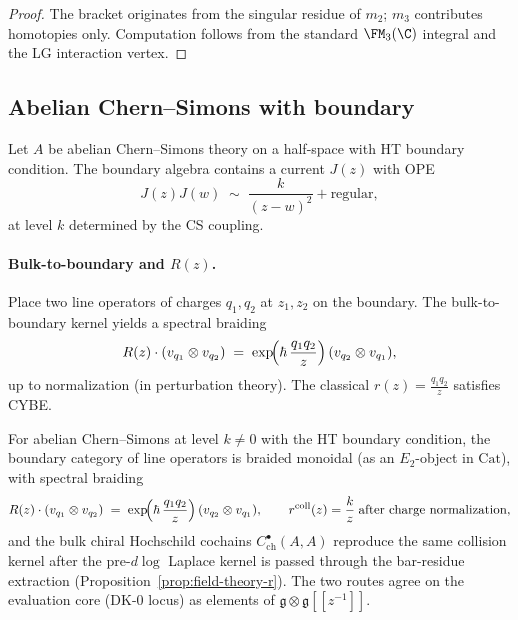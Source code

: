 \begin{proof}
The bracket originates from the singular residue of $m_2$; $m_3$ contributes homotopies only. Computation follows from the standard $\FM_3(\C)$ integral and the LG interaction vertex.
\end{proof}

\subsection{Abelian Chern--Simons with boundary}
\label{subsec:CS-abelian}
Let $A$ be abelian Chern--Simons theory on a half-space with HT boundary condition. The boundary algebra contains a current $J(z)$ with OPE
\[
J(z)J(w) \;\sim\; \frac{k}{(z-w)^2} + \text{regular},
\]
at level $k$ determined by the CS coupling.

\paragraph{Bulk-to-boundary and $R(z)$.}
Place two line operators of charges $q_1,q_2$ at $z_1,z_2$ on the boundary. The bulk-to-boundary kernel yields a spectral braiding
\[
R(z)\cdot (v_{q_1}\otimes v_{q_2}) \;=\; \exp\!\Bigl( \hbar\, \frac{q_1 q_2}{z} \Bigr) \,(v_{q_2}\otimes v_{q_1}),
\]
up to normalization (in perturbation theory). The classical $r(z)=\frac{q_1 q_2}{z}$ satisfies CYBE.

\begin{proposition}
\label{prop:CS-R}
For abelian Chern--Simons at level $k\neq 0$ with the HT boundary condition, the boundary category of line operators is braided monoidal (as an $E_2$-object in $\mathrm{Cat}$), with spectral braiding
\[
 R(z)\cdot(v_{q_1}\otimes v_{q_2})\;=\;\exp\!\Bigl(\hbar\,\frac{q_1q_2}{z}\Bigr)\,(v_{q_2}\otimes v_{q_1}),\qquad r^{\mathrm{coll}}(z)=\frac{k}{z}\;\text{after charge normalization},
\]
and the bulk chiral Hochschild cochains $C^{\bullet}_{\mathrm{ch}}(A,A)$ reproduce the same collision kernel after the pre-\textup{\(d\log\)} Laplace kernel is passed through the bar-residue extraction (Proposition~\ref{prop:field-theory-r}). The two routes agree on the evaluation core (DK-$0$ locus) as elements of $\mathfrak{g}\otimes\mathfrak{g}[\![z^{-1}]\!]$.
\end{proposition}

